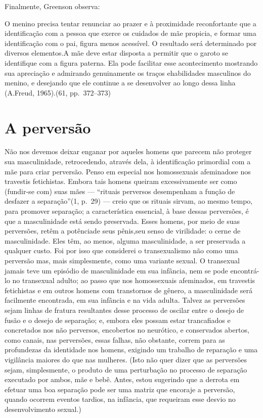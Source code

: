 Finalmente, Greenson observa:

O menino precisa tentar renunciar ao prazer e à proximidade
reconfortante que a identificação com a pessoa que exerce os cuidados
de mãe propicia, e formar uma identificação com o pai, figura menos
acessível. O resultado será determinado por diversos elementos.\idxhomosneur[|)] A mãe
deve estar disposta a permitir que o garoto se identifique com a figura
paterna. Ela pode facilitar esse acontecimento mostrando sua apreciação
e admirando genuinamente os traços e\idxangusimb[|)] habilidades masculinos do menino,
e desejando que ele continue a se desenvolver ao longo dessa linha (A.\idxangus[|)]
Freud,\idxannaf{} 1965).\idxgrens[|)] (61, pp.~372--373)


\section{A perversão}

Não nos devemos deixar enganar por aqueles homens que parecem não
proteger sua\idxtravemmasc{} masculinidade,\idxmascutra{} retrocedendo, através dela, à identificação
primordial com a mãe para criar perversão. Penso em especial nos
homossexuais afeminados\idxhomosafem[|(] e nos travestis fetichistas. Embora tais homens
queiram excessivamente ser como (fundir-se com) suas mães ---
``rituais perversos desempenham a função de desfazer\idxdesfa{} a
separação''\idxpervproce[|(] (1, p.~29) --- creio que os rituais sirvam,
ao mesmo tempo, para promover separação; a característica essencial, à
base dessas perversões, é que a masculinidade está sendo preservada.
Esses homens, por meio de suas perversões, retêm a potência\idxtravempote[|(] de seus
pênis,\idxpenisfant[|(] seu senso de virilidade: o cerne de masculinidade. Eles têm, ao
menos, alguma masculinidade, a ser preservada a qualquer custo. Foi por
isso que considerei o transexualismo não como uma perversão mas, mais
simplesmente, como uma variante sexual. O transexual jamais teve um
episódio de masculinidade em sua infância, nem se pode encontrá-lo no
transexual adulto; ao passo que nos homossexuais afeminados, em
travestis fetichistas e em outros homens com transtornos de gênero, a
masculinidade será facilmente encontrada, em sua infância e na vida
adulta. Talvez as perversões sejam linhas de fratura resultantes desse
processo de oscilar entre o desejo de fusão e o desejo de separação; e,
embora eles possam estar trancafiados e concretados nos não perversos,
encobertos no neurótico, e conservados abertos, como canais, nas
perversões, essas falhas, não obstante, correm para as profundezas da
identidade nos homens, exigindo um trabalho de reparação e uma
vigilância maiores do que nas mulheres. (Isto não quer dizer que as
perversões sejam, simplesmente, o produto de uma perturbação no
processo de separação executado por ambos, mãe e bebê. Antes, estou
sugerindo que a derrota em efetuar uma boa separação pode ser uma
matriz que encoraje a perversão, quando ocorrem eventos tardios, na
infância, que requeiram esse desvio no desenvolvimento sexual.)

